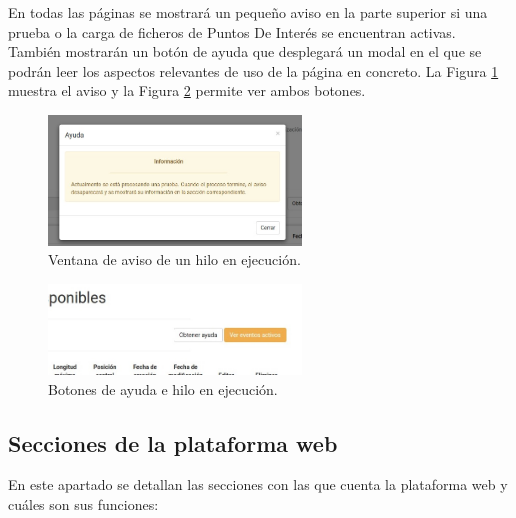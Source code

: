 En todas las páginas se mostrará un pequeño aviso en la parte superior si una prueba o la carga de ficheros de Puntos De Interés se encuentran activas. También mostrarán un botón de ayuda que desplegará un modal en el que se podrán leer los aspectos relevantes de uso de la página en concreto. La Figura \ref{ejealgo} muestra el aviso y la Figura \ref{botones} permite ver ambos botones.

\begin{figure}[h]
  \centering
    \includegraphics[width=0.6\textwidth]{../img/manualusuario/ejealgo.jpg}
  \caption{Ventana de aviso de un hilo en ejecución.}
  \label{ejealgo}
\end{figure}

\begin{figure}[h]
  \centering
    \includegraphics[width=0.6\textwidth]{../img/manualusuario/botones.jpg}
  \caption{Botones de ayuda e hilo en ejecución.}
  \label{botones}
\end{figure}

\subsection{Secciones de la plataforma web}

En este apartado se detallan las secciones con las que cuenta la plataforma web y cuáles son sus funciones:

